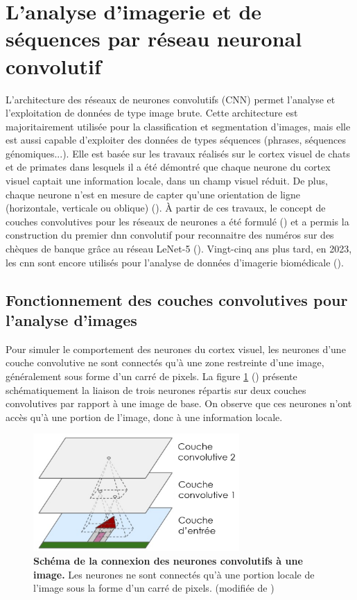 \section{L'analyse d'imagerie et de séquences par réseau neuronal convolutif}
L'architecture des réseaux de neurones convolutifs (CNN) permet l'analyse et l'exploitation de données de type image brute. Cette architecture est majoritairement utilisée pour la classification et segmentation d'images, mais elle est aussi capable d'exploiter des données de types séquences (phrases, séquences génomiques...). Elle est basée sur les travaux réalisés sur le cortex visuel de chats et de primates dans lesquels il a été démontré que chaque neurone du cortex visuel captait une information locale, dans un champ visuel réduit. De plus, chaque neurone n'est en mesure de capter qu'une orientation de ligne (horizontale, verticale ou oblique) (\cite{hubel_receptive_1959, hubel_single_1959}). À partir de ces travaux, le concept de couches convolutives pour les réseaux de neurones a été formulé (\cite{fukushima_neocognitron_1980}) et a permis la construction du premier \gls{dnn} convolutif pour reconnaitre des numéros sur des chèques de banque grâce au réseau LeNet-5 (\cite{lecun_gradient-based_1998}). Vingt-cinq ans plus tard, en 2023, les \gls{cnn} sont encore utilisés pour l'analyse de données d'imagerie biomédicale (\cite{holscher_next-generation_2023, ker_automated_2019}).
 
\subsection{Fonctionnement des couches convolutives pour l'analyse d'images}
Pour simuler le comportement des neurones du cortex visuel, les neurones d'une couche convolutive ne sont connectés qu'à une zone restreinte d'une image, généralement sous forme d'un carré de pixels. La figure \ref{fig:conv_simple} (\cite{aurelien_geron_hands-machine_2019}) présente schématiquement la liaison de trois neurones répartis sur deux couches convolutives par rapport à une image de base. On observe que ces neurones n'ont accès qu'à une portion de l'image, donc à une information locale. 
\begin{figure}[!htbp]
 \centering
 \includegraphics[width=0.7\textwidth]{figures/conv_simple.png}
 \caption[Schéma de la connection des neurones convolutifs à une image]{\textbf{Schéma de la connexion des neurones convolutifs à une image.} Les neurones ne sont connectés qu'à une portion locale de l'image sous la forme d'un carré de pixels. (modifiée de \cite{aurelien_geron_hands-machine_2019})}
 \label{fig:conv_simple}
\end{figure}


